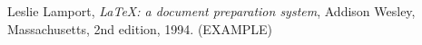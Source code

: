 \cleardoublepage
{}
\begin{thebibliography}{999}

  Leslie Lamport,
  \textit{\LaTeX: a document preparation system},
  Addison Wesley, Massachusetts,
  2nd edition,
  1994. (EXAMPLE)
  
\end{thebibliography}
